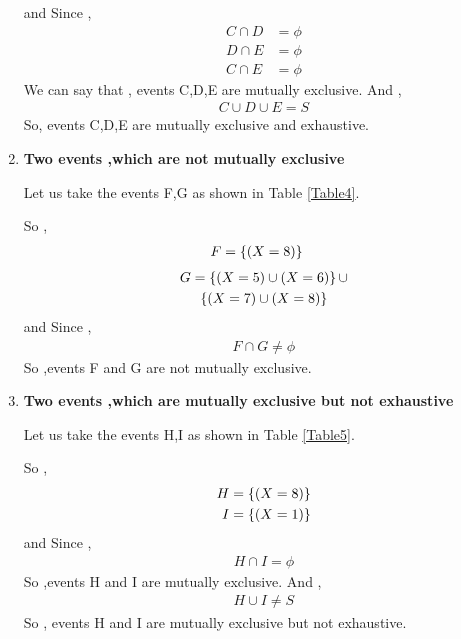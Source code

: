 \documentclass[journal,12pt,twocolumn]{IEEEtran}
\begin{document}
\begin{enumerate}[label=(\roman*)]
    and Since , 
    \begin{align}
        C \cap D &= \phi \\
        D \cap E &= \phi \\
        C \cap E &= \phi
    \end{align}
    We can say that , events C,D,E are mutually exclusive. And ,
    \begin{align}
        C \cup D \cup E = S 
    \end{align}  
    So, events C,D,E are mutually exclusive and exhaustive.
    
    \item \textbf{Two events ,which are not mutually exclusive}
    
    Let us take the events F,G as shown in Table \ref{Table4}.
    \begin{table}[ht!]
        
        \caption{}
        \label{Table4}
    \end{table}
    So ,
    \begin{align}
        F &= \left\{(X=8)\right\}
    \end{align}
    \begin{multline}
	    G =  \left\{(X=5) \cup (X=6)\right\} \cup \\
	         \left\{(X=7) \cup (X=8)\right\}
    \end{multline}
    and Since ,
    \begin{align}
        F \cap G \neq \phi
    \end{align}
    So ,events F and G are not mutually exclusive.
  
    \item \textbf{Two events ,which are mutually exclusive but not exhaustive}
    
    Let us take the events H,I as shown in Table \ref{Table5}.
    \begin{table}[ht!]
        
        \caption{}
        \label{Table5}
    \end{table}
    So ,
    \begin{align}
        H &= \left\{ (X=8) \right\} \\
        I &= \left\{ (X=1) \right\}
    \end{align}
    and Since ,
    \begin{align}
        H \cap I = \phi
    \end{align}
    So ,events H and I are mutually exclusive. And ,
    \begin{align}
        H \cup I \neq S
    \end{align}
    So , events H and I are mutually exclusive but not exhaustive.
    

\end{enumerate}
\end{document}
